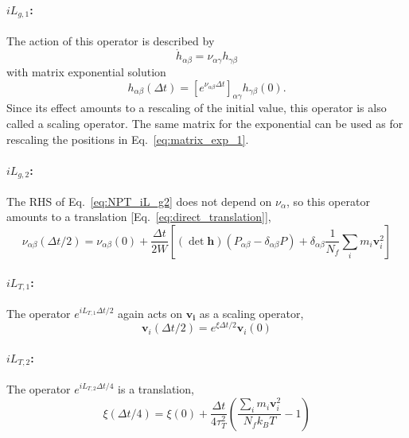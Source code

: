 \documentclass[12pt,letter]{article}
\renewcommand{\vec}[1]{\mathbf{#1}}
\begin{document}
\paragraph{$i L_{g,1}$:} The action of this operator is described by
\begin{equation}
\dot h_{\alpha\beta} = \nu_{\alpha\gamma} h_{\gamma\beta}  
\end{equation}
with matrix exponential solution
\begin{equation}
h_{\alpha\beta}(\Delta t) = \left[e^{\nu_{\alpha\beta}\Delta t}\right]_{\alpha\gamma} h_{\gamma\beta}(0).
\end{equation}
Since its effect amounts to a rescaling of the initial value, this operator 
is also called a scaling operator. The same matrix for the exponential can be used as for rescaling
the positions in Eq.~\eqref{eq:matrix_exp_1}.

\paragraph{$iL_{g,2}$:} The RHS of Eq.~\eqref{eq:NPT_iL_g2} does not depend
on $\nu_\alpha$, so this operator amounts to a translation [Eq.~\eqref{eq:direct_translation}],
\begin{equation}
\nu_{\alpha\beta}(\Delta t/2) = \nu_{\alpha\beta}(0) + \frac{\Delta t}{2 W} \left[(\det \vec h) \left( P_{\alpha \beta} - \delta_{\alpha\beta} P\right) +\delta_{\alpha\beta}
\frac{1}{N_f} \sum_i m_i \vec v_i^2\right] 
\end{equation}

\paragraph{$i L_{T,1}$:} The operator $e^{iL_{T,1} \Delta t/2}$ again acts
on $\vec{v_i}$ as a scaling operator,
\begin{equation}
\vec v_i(\Delta t/2) = e^{\xi \Delta t/2} \vec v_i(0)
\end{equation}

\paragraph{$i L_{T,2}$:} The operator $e^{i L_{T,2} \Delta t/4}$ is a translation,
\begin{equation}
\xi(\Delta t/4) = \xi(0) + \frac{\Delta t}{4\tau_T^2} \left(\frac{\sum_i m_i \vec v_i^2}{N_f k_B T} -1 \right)
\end{equation}
\end{document}
